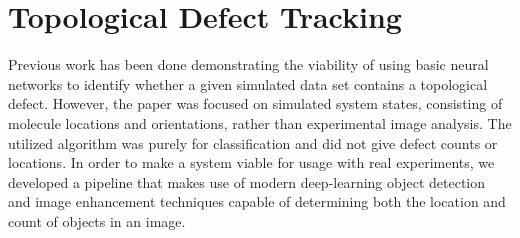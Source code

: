 \documentclass[prl,reprint,showpacs,floatfix,nofootinbib]{revtex4-1}
\begin{document}




\section{Topological Defect Tracking}

Previous work has been done demonstrating the viability of using basic neural networks to identify whether a given simulated data set contains a topological defect\cite{walters_machine_2019}. However, the paper was focused on simulated system states, consisting of molecule locations and orientations, rather than experimental image analysis. The utilized algorithm was purely for classification and did not give defect counts or locations. %
In order to make a system viable for usage with real experiments, we developed a pipeline that makes use of modern deep-learning object detection and image enhancement techniques capable of determining both the location and count of objects in an image. 
\end{document}
